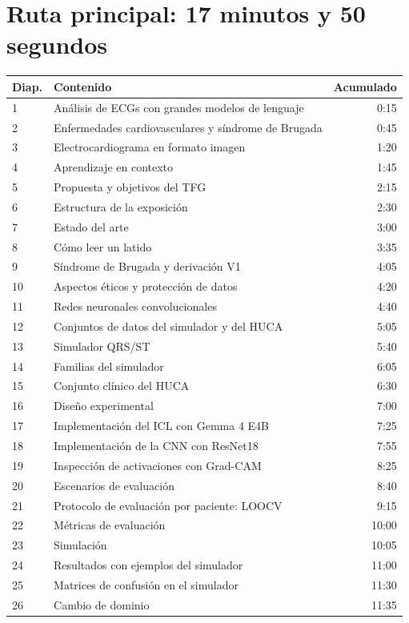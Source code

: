 \documentclass[11pt,a4paper]{article}
\begin{document}
\clearpage\section*{Ruta principal: 17 minutos y 50 segundos}
\begin{longtable}{p{12mm}p{112mm}r}\toprule Diap. & Contenido & Acumulado\\\midrule\endhead
1 & Análisis de ECGs con grandes modelos de lenguaje & 0:15\\
2 & Enfermedades cardiovasculares y síndrome de Brugada & 0:45\\
3 & Electrocardiograma en formato imagen & 1:20\\
4 & Aprendizaje en contexto & 1:45\\
5 & Propuesta y objetivos del TFG & 2:15\\
6 & Estructura de la exposición & 2:30\\
7 & Estado del arte & 3:00\\
8 & Cómo leer un latido & 3:35\\
9 & Síndrome de Brugada y derivación V1 & 4:05\\
10 & Aspectos éticos y protección de datos & 4:20\\
11 & Redes neuronales convolucionales & 4:40\\
12 & Conjuntos de datos del simulador y del HUCA & 5:05\\
13 & Simulador QRS/ST & 5:40\\
14 & Familias del simulador & 6:05\\
15 & Conjunto clínico del HUCA & 6:30\\
16 & Diseño experimental & 7:00\\
17 & Implementación del ICL con Gemma 4 E4B & 7:25\\
18 & Implementación de la CNN con ResNet18 & 7:55\\
19 & Inspección de activaciones con Grad-CAM & 8:25\\
20 & Escenarios de evaluación & 8:40\\
21 & Protocolo de evaluación por paciente: LOOCV & 9:15\\
22 & Métricas de evaluación & 10:00\\
23 & Simulación & 10:05\\
24 & Resultados con ejemplos del simulador & 11:00\\
25 & Matrices de confusión en el simulador & 11:30\\
26 & Cambio de dominio & 11:35\\

\end{longtable}
\end{document}

